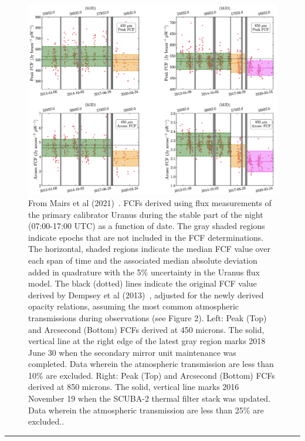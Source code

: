 \begin{center}
\begin{figure}
\includegraphics[width=0.9\linewidth]{sc21_FCFstep}
\caption[FCF step function]{From Mairs et al (2021)~\cite{mairs21}. FCFs derived using flux measurements of the primary calibrator Uranus during the stable part of the night (07:00-17:00 UTC) as a function of date. The gray shaded regions indicate epochs that are not included in the FCF determinations. The horizontal, shaded regions indicate the median FCF value over each span of time and the associated median absolute deviation added in quadrature with the 5\% uncertainty in the Uranus flux model. The black (dotted) lines indicate the original FCF value derived by Dempsey et al (2013)~\cite{dempsey12}, adjusted for the newly derived opacity relations, assuming the most common atmospheric transmissions during observations (see Figure 2). Left: Peak (Top) and Arcsecond (Bottom) FCFs derived at 450 microns. The solid, vertical line at the right edge of the latest gray region marks 2018 June 30 when the secondary mirror unit maintenance was completed. Data wherein the atmospheric transmission are less than 10\% are excluded. Right: Peak (Top) and Arcsecond (Bottom) FCFs derived at 850 microns. The solid, vertical line marks 2016 November 19 when the SCUBA-2 thermal filter stack was updated. Data wherein the atmospheric transmission are less than 25\% are excluded..}
\label{fig:FCFstep}
\end{figure}
\end{center}

\rule{1.0\textwidth}{2pt}

